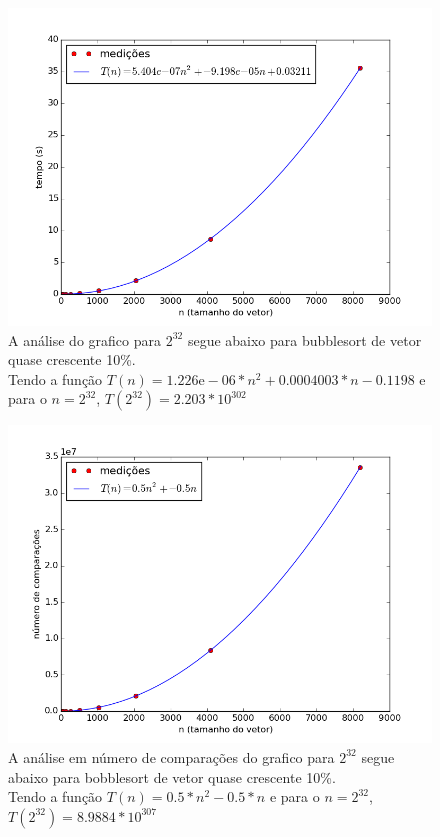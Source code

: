 \documentclass[12pt,a4paper,twoside]{report}
\begin{document}


\begin{figure}[ht]
\centering \includegraphics[scale=0.8]{../bolha/imagens/bolhaQuaseCresc100.png}
\caption{A análise do grafico para $2^{32}$ segue abaixo para bubblesort de vetor quase crescente 10\%.\\
Tendo a função $T(n) = 1.226\mathrm{e}-06*n^2+0.0004003*n-0.1198$ e para o $n =2^{32}$, $T(2^{32}) = 2.203 * 10^{302}$}
\label{fig:bolhaQuaseCresc100}
\end{figure}

\begin{figure}[ht]
\centering \includegraphics[scale=0.8]{../bolha/imagens/bolhaQuaseCresc101.png}
\caption{A análise em número de comparações do grafico para $2^{32}$ segue abaixo para bobblesort de vetor quase crescente 10\%.\\
Tendo a função $T(n) = 0.5*n^2 - 0.5*n$ e para o $n =2^{32}$, $T(2^{32}) = 8.9884 * 10^{307}$}
\label{fig:bolhaQuaseCresc101}
\end{figure}
\end{document}
